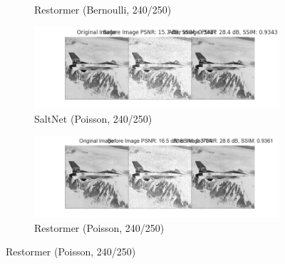 \begin{figure}[htpb]
\begin{subfigure}{0.48\textwidth}
        \caption{Restormer (Bernoulli, 240/250)}
    \end{subfigure}
    \begin{subfigure}{0.48\textwidth}
        \centering
        \includegraphics[width=\textwidth]{assets/240_pois_saltnet.png}
        \caption{SaltNet (Poisson, 240/250)}
    \end{subfigure}
    \hfill
    \begin{subfigure}{0.48\textwidth}
        \centering
        \includegraphics[width=\textwidth]{assets/240_pois_restormer.png}
        \caption{Restormer (Poisson, 240/250)}
    \end{subfigure}
\end{figure}

